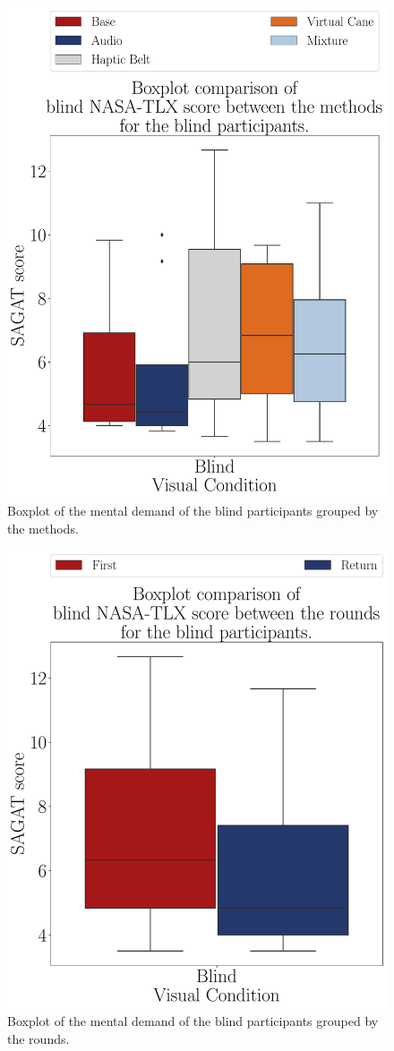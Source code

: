 \begin{figure}[!htb]
    \centering
    \includegraphics[width = 0.75\linewidth]{Resultados/Nasa/Figuras/pdf/boxplot_nasa_blind_scene.pdf}
    \caption{Boxplot of the mental demand of the blind participants grouped by the methods.}
    \label{fig:boxplot_nasa_blind_scene}
\end{figure}    
\begin{figure}[!htb]
    \centering
    \includegraphics[width = 0.75\linewidth]{Resultados/Nasa/Figuras/pdf/boxplot_nasa_blind_rounds.pdf}
    \caption{Boxplot of the mental demand of the blind participants grouped by the rounds.}
    \label{fig:boxplot_nasa_blind_rounds}
\end{figure}

